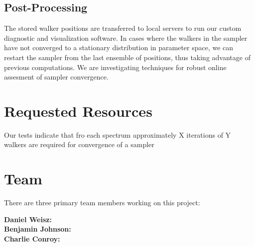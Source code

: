 \documentclass[11pt,preprint]{aastex}
\begin{document}
\subsection{Post-Processing}
The stored walker positions are transferred to local servers to run
our custom diagnostic and visualization software.  In cases where the
walkers in the sampler have not converged to a stationary distribution
in parameter space, we can restart the sampler from the last ensemble
of positions, thus taking advantage of previous computations.  We are
investigating techniques for robust online assesment of sampler
convergence.


\section{Requested Resources}
Our tests indicate that fro each spectrum approximately X iterations
of Y walkers are required for convergence of a sampler





\clearpage

\section{Team}

There are three primary team members working on this project:

\textbf{Daniel Weisz:} \\

\textbf{Benjamin Johnson:} \\

\textbf{Charlie Conroy:}





\end{document}
